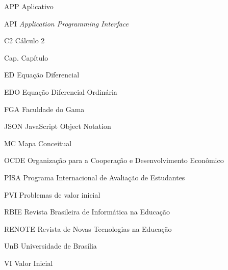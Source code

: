 \begin{siglas}
  \item[APP] Aplicativo
  \item[API] \textit{Application Programming Interface}
  \item[C2] Cálculo 2
  \item[Cap.] Capítulo
  \item[ED] Equação Diferencial
  \item[EDO] Equação Diferencial Ordinária
  \item[FGA] Faculdade do Gama
  \item[JSON] JavaScript Object Notation
  \item[MC] Mapa Conceitual
  \item[OCDE] Organização para a Cooperação e Desenvolvimento Econômico
  \item[PISA] Programa Internacional de Avaliação de Estudantes
  \item[PVI] Problemas de valor inicial
  \item[RBIE] Revista Brasileira de Informática na Educação
  \item[RENOTE] Revista de Novas Tecnologias na Educação
  \item[UnB] Universidade de Brasília
  \item[VI] Valor Inicial
\end{siglas}
